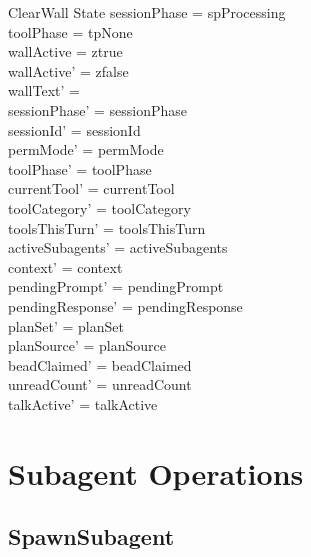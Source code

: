 \documentclass[a4paper,10pt,fleqn]{article}
\begin{document}
\begin{schema}{ClearWall}
  \Delta State
  \where
  sessionPhase = spProcessing \\
  toolPhase = tpNone \\
  wallActive = ztrue \\
  wallActive' = zfalse \\
  wallText' = \emptyset \\
  sessionPhase' = sessionPhase \\
  sessionId' = sessionId \\
  permMode' = permMode \\
  toolPhase' = toolPhase \\
  currentTool' = currentTool \\
  toolCategory' = toolCategory \\
  toolsThisTurn' = toolsThisTurn \\
  activeSubagents' = activeSubagents \\
  context' = context \\
  pendingPrompt' = pendingPrompt \\
  pendingResponse' = pendingResponse \\
  planSet' = planSet \\
  planSource' = planSource \\
  beadClaimed' = beadClaimed \\
  unreadCount' = unreadCount \\
  talkActive' = talkActive
\end{schema}

\section{Subagent Operations}

\subsection{SpawnSubagent}
\end{document}
